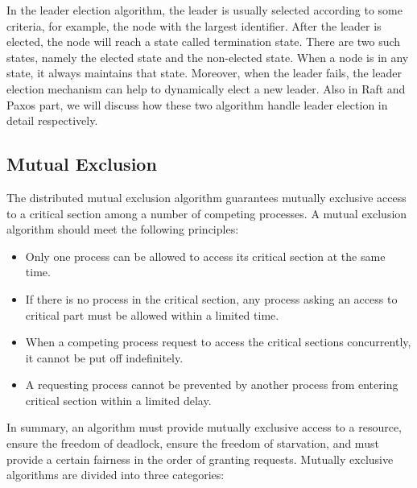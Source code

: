 \documentclass[12pt, a4paper]{article}
\begin{document}
In the leader election algorithm, the leader is usually selected according to 
some criteria, for example, the node with the largest 
identifier\cite{effatparvar2010improved}. After the leader is elected, the node 
will reach a state called termination state. There are two such states, namely 
the elected state and the non-elected state. When a node is in any state, 
it always maintains that state. Moreover, when the leader fails, the leader 
election mechanism can help to dynamically elect a new leader. Also in Raft and 
Paxos part, we will discuss how these two algorithm handle leader election in 
detail respectively.

\subsection{Mutual Exclusion}

The distributed mutual exclusion algorithm guarantees mutually exclusive access 
to a critical section among a number of competing 
processes\cite{lamport1987fast}. A mutual exclusion algorithm should meet the 
following principles\cite{velazques1993survey}: 

\begin{itemize}
  \item \textbf{}Only one process can be allowed to access its critical 
  section at the same time.
  \item \textbf{}If there is no process in the critical section, any 
  process asking an access to critical part must be allowed within a limited 
  time. 
  \item \textbf{}When a competing process request to access the critical 
  sections concurrently, it cannot be put off indefinitely.
  \item \textbf{}A requesting process cannot be prevented by another process 
  from entering critical section within a limited delay. 
\end{itemize}

In summary, an algorithm must provide mutually exclusive access to a resource, 
ensure the freedom of deadlock, ensure the freedom of starvation, and must 
provide a certain fairness in the order of granting requests. Mutually exclusive 
algorithms are divided into three categories:
\end{document}
